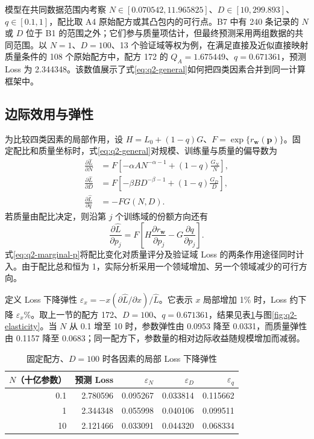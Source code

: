 模型在共同数据范围内考察 $N\in[0.070542,11.965825]$、$D\in[10,299.893]$、$q\in[0.1,1]$，配比取 A4 原始配方或其凸包内的可行点。B7 中有 240 条记录的 $N$ 或 $D$ 位于 B1 的范围之外；它们参与质量项估计，但最终预测采用两组数据的共同范围。以 $N=1$、$D=100$、13 个验证域等权为例，在满足直接及近似直接映射质量条件的 108 个原始配方中，配方 172 的 $Q_A=1.675449$、$q=0.671361$，预测 Loss 为 2.344348。该数值展示了式\eqref{eq:q2-general}如何把四类因素合并到同一计算框架中。

\subsection{边际效用与弹性}

为比较四类因素的局部作用，设 $H=L_0+(1-q)G$、$F=\exp\{r_{\boldsymbol w}(\boldsymbol p)\}$。固定配比和质量坐标时，式\eqref{eq:q2-general}对规模、训练量与质量的偏导数为
\begin{align}
 \frac{\partial\widehat L}{\partial N}
 &=F\left[-\alpha AN^{-\alpha-1}
             +(1-q)\frac{G_N}{N}\right],\label{eq:q2-marginal-n}\\
 \frac{\partial\widehat L}{\partial D}
 &=F\left[-\beta BD^{-\beta-1}
             +(1-q)\frac{G_D}{D}\right],\label{eq:q2-marginal-d}\\
 \frac{\partial\widehat L}{\partial q}&=-FG(N,D).\label{eq:q2-marginal-q}
\end{align}
若质量由配比决定，则沿第 $j$ 个训练域的份额方向还有
\begin{equation}
 \frac{\partial\widehat L}{\partial p_j}
 =F\left[H\frac{\partial r_{\boldsymbol w}}{\partial p_j}
       -G\frac{\partial q}{\partial p_j}\right].
 \label{eq:q2-marginal-p}
\end{equation}
式\eqref{eq:q2-marginal-p}将配比变化对质量评分及验证域 Loss 的两条作用途径同时计入。由于配比总和恒为 1，实际分析采用一个领域增加、另一个领域减少的可行方向。

定义 Loss 下降弹性 $\varepsilon_x=-x(\partial\widehat L/\partial x)/\widehat L$。它表示 $x$ 局部增加 1\% 时，Loss 约下降 $\varepsilon_x$\%。取上一节的配方 172、$D=100$、$q=0.671361$，结果见表\ref{tab:q2-elasticity}与图\ref{fig:q2-elasticity}。当 $N$ 从 0.1 增至 10 时，参数弹性由 0.0953 降至 0.0331，而质量弹性由 0.1157 降至 0.0683；同一配方下，参数量的相对边际收益随规模增加而减弱。

\begin{table}[htbp]
 \centering\small
 \caption{固定配方、$D=100$ 时各因素的局部 Loss 下降弹性}
 \label{tab:q2-elasticity}
 \begin{tabular}{rrrrr}
 \toprule
 $N$（十亿参数） & 预测 Loss & $\varepsilon_N$ & $\varepsilon_D$ & $\varepsilon_q$\\
 \midrule
 0.1 & 2.780596 & 0.095267 & 0.033814 & 0.115662\\
 1 & 2.344348 & 0.055998 & 0.040106 & 0.099511\\
 10 & 2.121466 & 0.033091 & 0.044320 & 0.068334\\
 \bottomrule
 \end{tabular}
\end{table}

